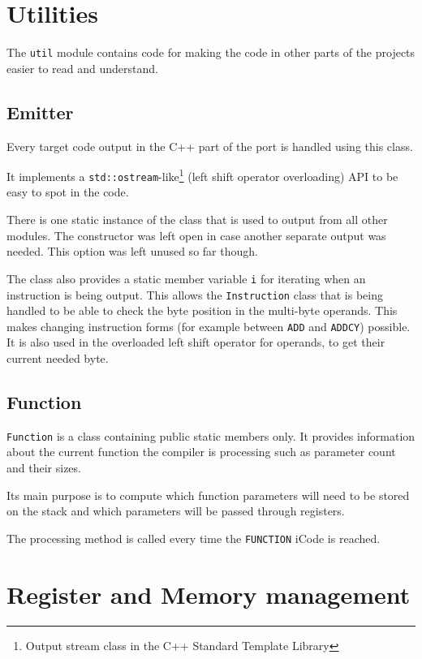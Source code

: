     \section{Utilities}

    The \texttt{util} module contains code for making the code in other parts of the projects easier to read and understand.

        \subsection{Emitter}\label{emitter}

        Every target code output in the C++ part of the port is handled using this class.

        It implements a \texttt{std::ostream}-like\footnote{Output stream class in the C++ Standard Template Library} (left shift operator overloading) API to be easy to spot in the code.

        There is one static instance of the class that is used to output from all other modules. The constructor was left open in case another separate output was needed. This option was left unused so far though.

        The class also provides a static member variable \texttt{i} for iterating when an instruction is being output. This allows the \texttt{Instruction} class that is being handled to be able to check the byte position in the multi-byte operands. This makes changing instruction forms (for example between \texttt{ADD} and \texttt{ADDCY}) possible. It is also used in the overloaded left shift operator for operands, to get their current needed byte.

        \subsection{Function}

        \texttt{Function} is a class containing public static members only. It provides information about the current function the compiler is processing such as parameter count and their sizes.

        Its main purpose is to compute which function parameters will need to be stored on the stack and which parameters will be passed through registers.

        The processing method is called every time the \texttt{FUNCTION} iCode is reached.

    \section{Register and Memory management}

